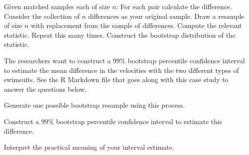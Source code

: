 \clearpage


\bbox
Given matched samples each of size $n$:
\bi
\ii For each pair calculate the difference.
\ii Consider the collection of $n$ differences as your original sample.
\ii Draw a resample of size $n$ with replacement from the sample of differences. Compute the relevant statistic.
\ii Repeat this many times.
\ii Construct the bootstrap distribution of the statistic.
\ei
\ebox


\bb[resume]
\ii The researchers want to construct a 99\% bootstrap percentile confidence interval to estimate the mean difference in the velocities with the two different types of swimsuits. See the R Markdown file that goes along with this case study to answer the questions below.

\bb
\ii Generate one possible bootstrap resample using this process. \vfill


\ii Construct a 99\% bootstrap percentile confidence interval to estimate this difference. \vfill

\ii Interpret the practical meaning of your interval estimate. \vfill
\ee
\ee






